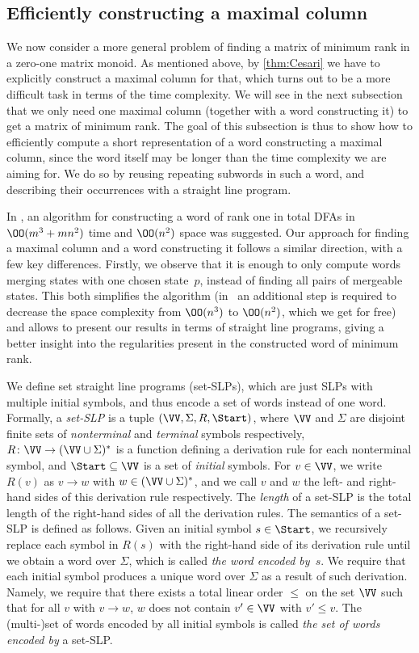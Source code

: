 \subsection{Efficiently constructing a maximal column}\label{subsec:max-col} 

We now consider a more general problem of finding a matrix of minimum rank in a zero-one matrix monoid. As mentioned above, by \autoref{thm:Cesari} we have to explicitly construct a maximal column for that, which turns out to be a more difficult task in terms of the time complexity. We will see in the next subsection that we only need one maximal column (together with a word constructing it) to get a matrix of minimum rank.
The goal of this subsection is thus to show how to efficiently compute a short representation of a word constructing a maximal column, since the word itself may be longer than the time complexity we are aiming for. We do so by reusing repeating subwords in such a word, and describing their occurrences with a straight line program.

In \cite[Section 5]{Eppstein1990}, an algorithm for constructing a word of rank one in total DFAs in $\OO(m^3 + mn^2)$ time and $\OO(n^2)$ space was suggested. Our approach for finding a maximal column and a word constructing it follows a similar direction, with a few key differences. Firstly, we observe that it is enough to only compute words merging states with one chosen state~$p$, instead of finding all pairs of mergeable states. This both simplifies the algorithm (in~\cite{Eppstein1990} an additional step is required to decrease the space complexity from $\OO(n^3)$ to $\OO(n^2)$, which we get for free) and allows to present our results in terms of straight line programs, giving a better insight into the regularities present in the constructed word of minimum rank.

We define set straight line programs (set-SLPs), which are just SLPs with multiple initial symbols, and thus encode a set of words instead of one word.
Formally, a \emph{set-SLP} is a tuple $(\VV, \Sigma, R, \Start)$, where $\VV$ and $\Sigma$ are disjoint finite sets of \emph{nonterminal} and \emph{terminal} symbols respectively, $R \colon \VV \to (\VV \cup \Sigma)^*$ is a function defining a derivation rule for each nonterminal symbol, and $\Start \subseteq \VV$ is a set of \emph{initial} symbols. For $v \in \VV$, we write $R(v)$ as $v \to w$ with $w \in (\VV \cup \Sigma)^*$, and we call $v$ and $w$ the left- and right-hand sides of this derivation rule respectively. The \emph{length} of a set-SLP is the total length of the right-hand sides of all the derivation rules.
The semantics of a set-SLP is defined as follows. Given an initial symbol $s \in \Start$, we recursively replace each symbol in $R(s)$ with the right-hand side of its derivation rule until we obtain a word over $\Sigma$, which is called \emph{the word encoded by~$s$}.
We require that each initial symbol produces a unique word over $\Sigma$ as a result of such derivation. Namely, we require that there exists a total linear order $\le$ on the set $\VV$ such that for all $v$ with $v \to w$, $w$ does not contain $v' \in \VV$ with $v' \le v$. The (multi-)set of words encoded by all initial symbols is called \emph{the set of words encoded by} a set-SLP.

